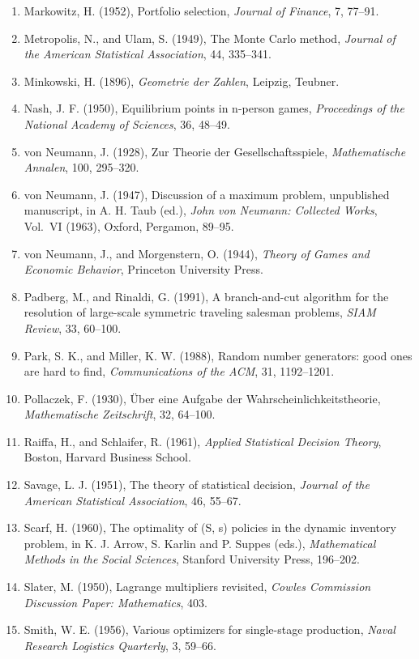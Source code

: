 \documentclass[11pt,a4paper]{article}
\numberwithin{equation}{section}
\theoremstyle{definition}
\begin{document}
\begin{enumerate}
\item Markowitz, H. (1952), Portfolio selection, \emph{Journal of Finance}, 7, 77--91.
\item Metropolis, N., and Ulam, S. (1949), The Monte Carlo method, \emph{Journal of the American Statistical Association}, 44, 335--341.
\item Minkowski, H. (1896), \emph{Geometrie der Zahlen}, Leipzig, Teubner.
\item Nash, J. F. (1950), Equilibrium points in n-person games, \emph{Proceedings of the National Academy of Sciences}, 36, 48--49.
\item von Neumann, J. (1928), Zur Theorie der Gesellschaftsspiele, \emph{Mathematische Annalen}, 100, 295--320.
\item von Neumann, J. (1947), Discussion of a maximum problem, unpublished manuscript, in A. H. Taub (ed.), \emph{John von Neumann: Collected Works}, Vol.~VI (1963), Oxford, Pergamon, 89--95.
\item von Neumann, J., and Morgenstern, O. (1944), \emph{Theory of Games and Economic Behavior}, Princeton University Press.
\item Padberg, M., and Rinaldi, G. (1991), A branch-and-cut algorithm for the resolution of large-scale symmetric traveling salesman problems, \emph{SIAM Review}, 33, 60--100.
\item Park, S. K., and Miller, K. W. (1988), Random number generators: good ones are hard to find, \emph{Communications of the ACM}, 31, 1192--1201.
\item Pollaczek, F. (1930), \"Uber eine Aufgabe der Wahrscheinlichkeitstheorie, \emph{Mathematische Zeitschrift}, 32, 64--100.
\item Raiffa, H., and Schlaifer, R. (1961), \emph{Applied Statistical Decision Theory}, Boston, Harvard Business School.
\item Savage, L. J. (1951), The theory of statistical decision, \emph{Journal of the American Statistical Association}, 46, 55--67.
\item Scarf, H. (1960), The optimality of (S, s) policies in the dynamic inventory problem, in K. J. Arrow, S. Karlin and P. Suppes (eds.), \emph{Mathematical Methods in the Social Sciences}, Stanford University Press, 196--202.
\item Slater, M. (1950), Lagrange multipliers revisited, \emph{Cowles Commission Discussion Paper: Mathematics}, 403.
\item Smith, W. E. (1956), Various optimizers for single-stage production, \emph{Naval Research Logistics Quarterly}, 3, 59--66.

\end{enumerate}
\end{document}
